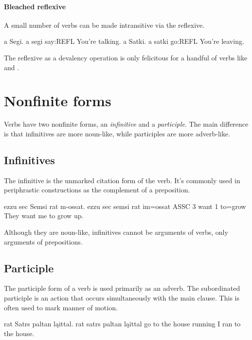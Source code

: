 \paragraph{Bleached reflexive}
A small number of verbs can be made intransitive via the reflexive.

\begin{examples}
	\ex
		\script a Segi.
		\bits a segi
		 say:REFL
		\tr You're talking.
	\ex
		\script a Satki.
		\bits a satki
		 go:REFL
		\tr You're leaving.
\end{examples}

The reflexive as a devalency operation is only felicitous for a handful of verbs like  and .

\section{Nonfinite forms} \label{sec:nonfinite}
Verbs have two nonfinite forms, an \emph{infinitive} and a \emph{participle}. The main difference is that infinitives are more noun-like, while participles are more adverb-like.

\subsection{Infinitives}
The infinitive is the unmarked citation form of the verb. It's commonly used in periphrastic constructions as the complement of a preposition.

\begin{example}
	\script ezzu sec Semsi rat m-ossat.
	\bits ezzu sec semsi rat im=ossat
	\gloss ASSC 3 want 1 to=grow
	\tr They want me to grow up.
\end{example}

Although they are noun-like, infinitives cannot be arguments of verbs, only arguments of prepositions.

\subsection{Participle}
The participle form of a verb is used primarily as an adverb. The subordinated participle is an action that occurs simultaneously with the main clause. This is often used to mark manner of motion.

\begin{example}
	\script rat Satrs paltan ląittal.
	\bits rat satrs paltan ląittal
	 {go to} {the house} running
	\tr I ran to the house.
\end{example}

